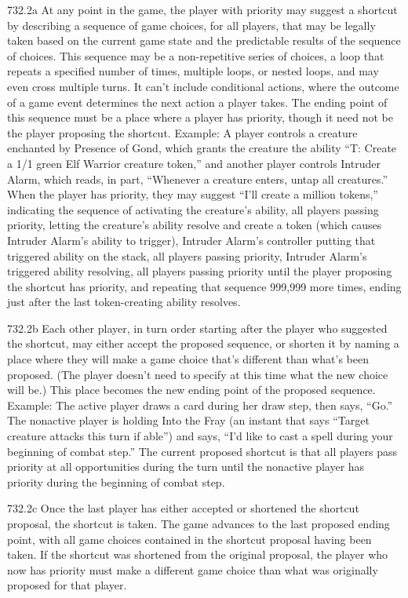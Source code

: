 732.2a At any point in the game, the player with priority may suggest a shortcut by describing a sequence of game choices, for all players, that may be legally taken based on the current game state and the predictable results of the sequence of choices. This sequence may be a non-repetitive series of choices, a loop that repeats a specified number of times, multiple loops, or nested loops, and may even cross multiple turns. It can’t include conditional actions, where the outcome of a game event determines the next action a player takes. The ending point of this sequence must be a place where a player has priority, though it need not be the player proposing the shortcut.
Example: A player controls a creature enchanted by Presence of Gond, which grants the creature the ability “{T}: Create a 1/1 green Elf Warrior creature token,” and another player controls Intruder Alarm, which reads, in part, “Whenever a creature enters, untap all creatures.” When the player has priority, they may suggest “I’ll create a million tokens,” indicating the sequence of activating the creature’s ability, all players passing priority, letting the creature’s ability resolve and create a token (which causes Intruder Alarm’s ability to trigger), Intruder Alarm’s controller putting that triggered ability on the stack, all players passing priority, Intruder Alarm’s triggered ability resolving, all players passing priority until the player proposing the shortcut has priority, and repeating that sequence 999,999 more times, ending just after the last token-creating ability resolves.

732.2b Each other player, in turn order starting after the player who suggested the shortcut, may either accept the proposed sequence, or shorten it by naming a place where they will make a game choice that’s different than what’s been proposed. (The player doesn’t need to specify at this time what the new choice will be.) This place becomes the new ending point of the proposed sequence.
Example: The active player draws a card during her draw step, then says, “Go.” The nonactive player is holding Into the Fray (an instant that says “Target creature attacks this turn if able”) and says, “I’d like to cast a spell during your beginning of combat step.” The current proposed shortcut is that all players pass priority at all opportunities during the turn until the nonactive player has priority during the beginning of combat step.

732.2c Once the last player has either accepted or shortened the shortcut proposal, the shortcut is taken. The game advances to the last proposed ending point, with all game choices contained in the shortcut proposal having been taken. If the shortcut was shortened from the original proposal, the player who now has priority must make a different game choice than what was originally proposed for that player.

